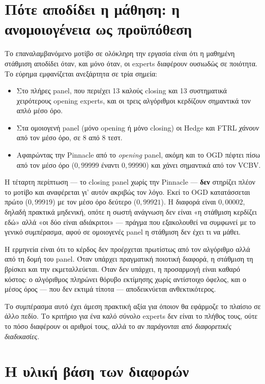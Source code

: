 \documentclass[12pt,a4paper,oneside]{report}
\renewcommand{\_}{\oldunderscore\allowbreak}
\theoremstyle{definition}
\theoremstyle{plain}
\theoremstyle{remark}
\begin{document}
\section{Πότε αποδίδει η μάθηση: η ανομοιογένεια ως προϋπόθεση}
\label{sec:disc-hetero}

Το επαναλαμβανόμενο μοτίβο σε ολόκληρη την εργασία είναι ότι η μαθημένη στάθμιση αποδίδει
όταν, και μόνο όταν, οι experts διαφέρουν ουσιωδώς σε ποιότητα. Το εύρημα εμφανίζεται
ανεξάρτητα σε τρία σημεία:

\begin{itemize}
  \item Στο πλήρες panel, που περιέχει 13 καλούς closing και 13 συστηματικά χειρότερους
        opening experts, και οι τρεις αλγόριθμοι κερδίζουν σημαντικά τον απλό μέσο όρο.
  \item Στα ομοιογενή panel (μόνο opening ή μόνο closing) οι Hedge και FTRL \emph{χάνουν}
        από τον μέσο όρο, σε 8 από 8 τεστ.
  \item Αφαιρώντας την Pinnacle από το \emph{opening} panel, ακόμη και το OGD πέφτει πίσω
        από τον μέσο όρο ($0{,}99999$ έναντι $0{,}99990$) και χάνει σημαντικά από τον VC\_BV.
\end{itemize}

Η τέταρτη περίπτωση --- το closing panel χωρίς την Pinnacle --- \textbf{δεν} στηρίζει πλέον
το μοτίβο και αναφέρεται γι' αυτόν ακριβώς τον λόγο. Εκεί το OGD κατατάσσεται πρώτο
($0{,}99919$) με τον μέσο όρο δεύτερο ($0{,}99921$). Η διαφορά είναι $0{,}00002$, δηλαδή
πρακτικά μηδενική, οπότε η σωστή ανάγνωση δεν είναι «η στάθμιση κερδίζει εδώ» αλλά «οι δύο
είναι αδιάκριτοι» --- πράγμα που εξακολουθεί να συμφωνεί με το γενικό συμπέρασμα, αφού σε
ομοιογενές panel η στάθμιση δεν έχει τι να μάθει.

Η ερμηνεία είναι ότι το κέρδος δεν προέρχεται πρωτίστως από τον αλγόριθμο αλλά από τη δομή
του panel. Όταν υπάρχει πραγματική ποιοτική διαφορά, η στάθμιση τη βρίσκει και την
εκμεταλλεύεται. Όταν δεν υπάρχει, η προσαρμογή είναι καθαρό κόστος: ο αλγόριθμος πληρώνει
θόρυβο εκτίμησης χωρίς αντίστοιχο όφελος, και ο μέσος όρος --- που δεν εκτιμά τίποτα ---
αποδεικνύεται ανθεκτικότερος.

Το συμπέρασμα αυτό έχει άμεση πρακτική αξία για όποιον θα εφάρμοζε το πλαίσιο σε άλλο πεδίο.
Το κριτήριο για ένα καλό σύνολο experts δεν είναι το πλήθος τους, ούτε το πόσο διαφέρουν οι
αριθμοί τους, αλλά το αν \emph{παράγονται από διαφορετικές διαδικασίες}.

\section{Η υλική βάση των διαφορών}
\label{sec:disc-material}
\end{document}

